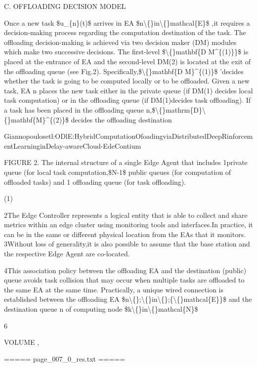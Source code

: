 \documentclass{article}
\begin{document}
C. OFFLOADING DECISION MODEL

Once a new task \$u\_\{n\}(t)\$ arrives in EA \$n\textbackslash\{\}in\textbackslash\{\}mathcal\{E\}\$ ,it requires a decision-making process regarding the computation destination of the task. The offloading decision-making is achieved via two decision maker (DM) modules which make two successive decisions. The first-level \$\textbackslash\{\}mathbf\{D M\textasciicircum{}\{(1)\}\}\$ is placed at the entrance of EA and the second-level DM(2) is located at the exit of the offloading queue (see Fig.2). Specifically,\$\textbackslash\{\}mathbf\{D M\}\textasciicircum{}\{(1)\}\$ 'decides whether the task is going to be computed locally or to be offloaded. Given a new task, EA n places the new task either in the private queue (if DM(1) decides local task computation) or in the offloading queue (if DM(1)decides task offloading). If a task has been placed in the offloading queue n,\$\textbackslash\{\}mathrm\{D\}\textbackslash\{\}mathbf\{M\}\textasciicircum{}\{(2)\}\$ decides the offloading destination

Giannopoulosetl:ODlE:HybridComputationOfoadingviaDistributedDeepRinforcementLearninginDelay-awareCloud-EdeContium

FIGURE 2. The internal structure of a single Edge Agent that includes 1private queue (for local task computation,\$N-1\$ public queues (for computation of offloaded tasks) and 1 offloading queue (for task offloading).

(1)

2The Edge Controller represents a logical entity that is able to collect and share metrics within an edge cluster using monitoring tools and interfaces.In practice, it can be in the same or different physical location from the EAs that it monitors.
3Without loss of generality,it is also possible to assume that the base station and the respective Edge Agent are co-located.

4This association policy between the offloading EA and the destination (public) queue avoids task collision that may occur when multiple tasks are offloaded to the same EA at the same time. Practically, a unique wired connection is established between the offloading EA \$n\textbackslash\{\};\textbackslash\{\}in\textbackslash\{\};\{\textbackslash\{\}mathcal\{E\}\}\$ and the destination queue n of computing node \$k\textbackslash\{\}in\textbackslash\{\}mathcal\{N\}\$

6

VOLUME ,

===== page\_007\_0\_res.txt =====
\end{document}
